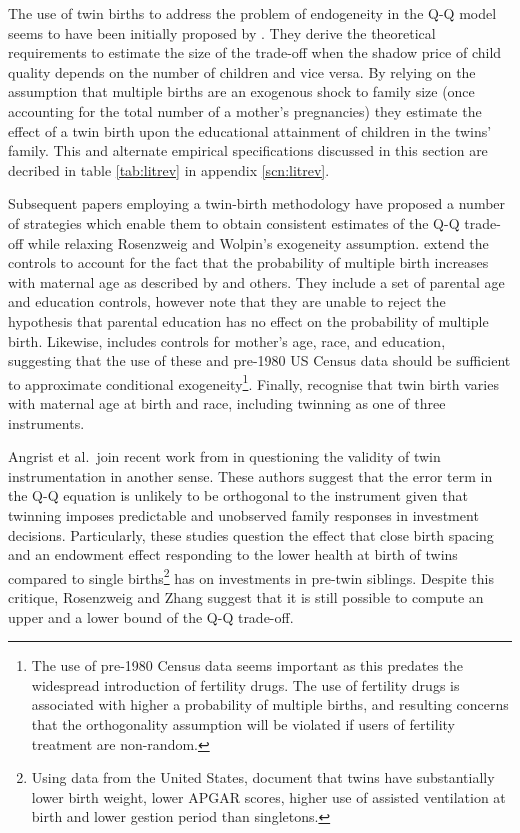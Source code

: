 The use of twin births to address the problem of endogeneity in the Q-Q model seems to have been initially proposed by \citet{RosenzweigWolpin1980}.  
They derive the theoretical requirements to estimate the size of the trade-off when the shadow price of child quality depends on the number 
of children and vice versa.  By relying on the assumption that multiple births are an exogenous shock to family size (once accounting for 
the total number of a mother's pregnancies) they estimate the effect of a twin birth upon the educational attainment of children in the twins' 
family.  This and alternate empirical specifications discussed in this section are decribed in table \ref{tab:litrev} in appendix \ref{scn:litrev}.  

Subsequent papers employing a twin-birth methodology have proposed a number of strategies which enable them to obtain consistent estimates of 
the Q-Q trade-off while relaxing Rosenzweig and Wolpin's exogeneity assumption.  \citet{Blacketal2005} extend the controls to account for the 
fact that the probability of multiple birth increases with maternal age as described by \citet{Jacobsenetal1999} and others.  They include a 
set of parental age and education controls, however note that they are unable to reject the hypothesis that parental education has no effect 
on the probability of multiple birth.  Likewise, \citet{Caceres2006} includes controls for mother's age, race, and education, suggesting that 
the use of these and pre-1980 US Census data should be sufficient to approximate conditional exogeneity\footnote{The use of pre-1980 Census 
data seems important as this predates the widespread introduction of fertility drugs.  The use of fertility drugs is associated with higher a 
probability of multiple births, and resulting concerns that the orthogonality assumption will be violated if users of fertility treatment are 
non-random.}.  Finally, \citet{Angristetal2010} recognise that twin birth varies with maternal age at birth and race, including twinning as 
one of three instruments. 

Angrist et al.\ join recent work from \citet{RosenzweigZhang2009} in questioning the validity of twin instrumentation in another sense.  These 
authors suggest that the error term in the Q-Q equation is unlikely to be orthogonal to the instrument given that twinning imposes predictable 
and unobserved family responses in investment decisions.  Particularly, these studies question the effect that close birth spacing and an endowment 
effect responding to the lower health at birth of twins compared to single births\footnote{Using data from the United States, \citet{Almondetal2005} 
document that twins have substantially lower birth weight, lower APGAR scores, higher use of assisted ventilation at birth and lower gestion period 
than singletons.} has on investments in pre-twin siblings.  Despite this critique, Rosenzweig and Zhang suggest that it is still possible to compute 
an upper and a lower bound of the Q-Q trade-off.

